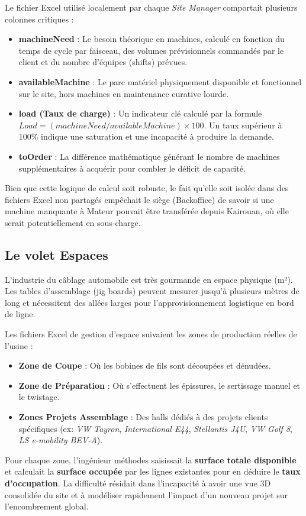 Le fichier Excel utilisé localement par chaque \textit{Site Manager} comportait plusieurs colonnes critiques :
\begin{itemize}
    \item \textbf{machineNeed} : Le besoin théorique en machines, calculé en fonction du temps de cycle par faisceau, des volumes prévisionnels commandés par le client et du nombre d'équipes (shifts) prévues.
    \item \textbf{availableMachine} : Le parc matériel physiquement disponible et fonctionnel sur le site, hors machines en maintenance curative lourde.
    \item \textbf{load (Taux de charge)} : Un indicateur clé calculé par la formule $Load = (machineNeed / availableMachine) \times 100$. Un taux supérieur à 100\% indique une saturation et une incapacité à produire la demande.
    \item \textbf{toOrder} : La différence mathématique générant le nombre de machines supplémentaires à acquérir pour combler le déficit de capacité.
\end{itemize}
Bien que cette logique de calcul soit robuste, le fait qu'elle soit isolée dans des fichiers Excel non partagés empêchait le siège (Backoffice) de savoir si une machine manquante à Mateur pouvait être transférée depuis Kairouan, où elle serait potentiellement en sous-charge.

\subsection{Le volet Espaces}
L'industrie du câblage automobile est très gourmande en espace physique (m²). Les tables d'assemblage (jig boards) peuvent mesurer jusqu'à plusieurs mètres de long et nécessitent des allées larges pour l'approvisionnement logistique en bord de ligne. 

Les fichiers Excel de gestion d'espace suivaient les zones de production réelles de l'usine :
\begin{itemize}
    \item \textbf{Zone de Coupe} : Où les bobines de fils sont découpées et dénudées.
    \item \textbf{Zone de Préparation} : Où s'effectuent les épissures, le sertissage manuel et le twistage.
    \item \textbf{Zones Projets Assemblage} : Des halls dédiés à des projets clients spécifiques (ex: \textit{VW Tayron}, \textit{International E44}, \textit{Stellantis J4U}, \textit{VW Golf 8}, \textit{LS e-mobility BEV-A}).
\end{itemize}
Pour chaque zone, l'ingénieur méthodes saisissait la \textbf{surface totale disponible} et calculait la \textbf{surface occupée} par les lignes existantes pour en déduire le \textbf{taux d'occupation}. La difficulté résidait dans l'incapacité à avoir une vue 3D consolidée du site et à modéliser rapidement l'impact d'un nouveau projet sur l'encombrement global.

